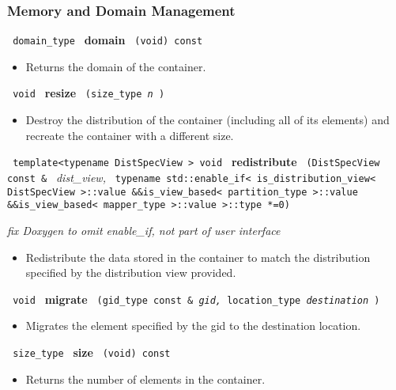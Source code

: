 \subsubsection{Memory and Domain Management}

\noindent
\texttt{%
domain\_type
}
\textbf{domain}%
\texttt{%
(void) const
}

\begin{itemize}
\item
Returns the domain of the container.
\end{itemize}
 
\noindent
\texttt{%
void 
}
\textbf{resize}%
\texttt{%
(size\_type 
\textit{n}%
)
}

\begin{itemize}
\item
Destroy the distribution of the container (including all of its elements) and recreate the container with a different size. 
\end{itemize}
 
\noindent
\texttt{%
template<typename DistSpecView >
void
}
\textbf{redistribute}%
\texttt{%
(DistSpecView const \&
}
\textit{dist\_view,}
\texttt{
typename std::enable\_if< is\_distribution\_view< DistSpecView >::value \&\&is\_view\_based< partition\_type >::value \&\&is\_view\_based< mapper\_type >::value >::type *=0)
}

\vspace{0.4cm} \emph{fix Doxygen to omit enable\_if, not part of user interface}

\begin{itemize}
\item
Redistribute the data stored in the container to match the distribution specified by the distribution view provided. 
\end{itemize}
 
\noindent
\texttt{%
void
}
\textbf{migrate}%
\texttt{%
(gid\_type const \&
\textit{gid,}%
location\_type 
\textit{destination}
)
}

\begin{itemize}
\item
Migrates the element specified by the gid to the destination location. 
\end{itemize}
 
\noindent
\texttt{%
size\_type
}
\textbf{size}%
\texttt{%
(void) const
}

\begin{itemize}
\item
Returns the number of elements in the container. 
\end{itemize}
 
